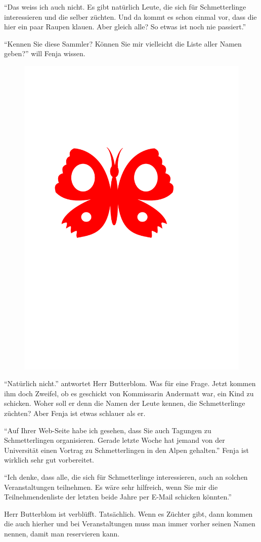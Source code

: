 \enquote{Das weiss ich auch nicht. Es gibt natürlich Leute, die sich für Schmetterlinge interessieren und die selber züchten. Und da kommt es schon einmal vor, dass die hier ein paar Raupen klauen. Aber gleich alle? So etwas ist noch nie passiert.} 

\enquote{Kennen Sie diese Sammler? Können Sie mir vielleicht die Liste aller Namen geben?} will Fenja wissen.

\begin{figure}[H]
\centering
\includegraphics[width=.05\textwidth]{bilder/inkling.pdf}
\end{figure}

\enquote{Natürlich nicht.} antwortet Herr Butterblom. Was für eine Frage. Jetzt kommen ihm doch Zweifel, ob es geschickt von Kommissarin Andermatt war, ein Kind zu schicken. Woher soll er denn die Namen der Leute kennen, die Schmetterlinge züchten? Aber Fenja ist etwas schlauer als er.

\enquote{Auf Ihrer Web-Seite habe ich gesehen, dass Sie auch Tagungen zu Schmetterlingen organisieren. Gerade letzte Woche hat jemand von der Universität einen Vortrag zu Schmetterlingen in den Alpen gehalten.} Fenja ist wirklich sehr gut vorbereitet. 

\enquote{Ich denke, dass alle, die sich für Schmetterlinge interessieren, auch an solchen Veranstaltungen teilnehmen. Es wäre sehr hilfreich, wenn Sie mir die Teilnehmendenliste der letzten beide Jahre per E-Mail schicken könnten.}

Herr Butterblom ist verblüfft. Tatsächlich. Wenn es Züchter gibt, dann kommen die auch hierher und bei Veranstaltungen muss man immer vorher seinen Namen nennen, damit man reservieren kann. 

